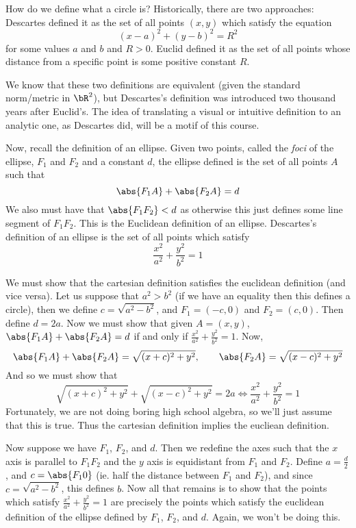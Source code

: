 \documentclass[10pt]{article}
\begin{document}


\bigskip

How do we define what a circle is?
Historically, there are two approaches: Descartes defined it as the set of all points $(x,y)$ which satisfy the equation
\[ (x-a)^2 + (y-b)^2 = R^2 \]
for some values $a$ and $b$ and $R>0$.
Euclid defined it as the set of all points whose distance from a specific point is some positive constant $R$.

We know that these two definitions are equivalent (given the standard norm/metric in $\bR^2$), but Descartes's definition was introduced two thousand years after Euclid's.
The idea of translating a visual or intuitive definition to an analytic one, as Descartes did, will be a motif of this course.

Now, recall the definition of an ellipse.
Given two points, called the \emph{foci} of the ellipse, $F_1$ and $F_2$ and a constant $d$, the ellipse defined is the set of all points $A$ such that
\[ \abs{F_1A} + \abs{F_2A} = d \]
We also must have that $\abs{F_1F_2}<d$ as otherwise this just defines some line segment of $F_1F_2$.
This is the Euclidean definition of an ellipse.
Descartes's definition of an ellipse is the set of all points which satisfy
\[ \frac{x^2}{a^2} + \frac{y^2}{b^2} = 1 \]

We must show that the cartesian definition satisfies the euclidean definition (and vice versa).
Let us suppose that $a^2>b^2$ (if we have an equality then this defines a circle), then we define $c=\sqrt{a^2-b^2}$, and $F_1=(-c,0)$ and $F_2=(c,0)$.
Then define $d=2a$.
Now we must show that given $A=(x,y)$, $\abs{F_1A}+\abs{F_2A}=d$ if and only if $\frac{x^2}{a^2} + \frac{y^2}{b^2} = 1$.
Now,
\[ \abs{F_1A} + \abs{F_2A} = \sqrt{(x+c)^2 + y^2},\qquad \abs{F_2A} = \sqrt{(x-c)^2 + y^2} \]
And so we must show that
\[ \sqrt{(x+c)^2 + y^2} + \sqrt{(x-c)^2 + y^2} = 2a \iff \frac{x^2}{a^2} + \frac{y^2}{b^2} = 1 \]
Fortunately, we are not doing boring high school algebra, so we'll just assume that this is true.
Thus the cartesian definition implies the eucliean definition.

Now suppose we have $F_1$, $F_2$, and $d$.
Then we redefine the axes such that the $x$ axis is parallel to $F_1F_2$ and the $y$ axis is equidistant from $F_1$ and $F_2$.
Define $a=\frac d2$, and $c=\abs{F_10}$ (ie. half the distance between $F_1$ and $F_2$), and since $c=\sqrt{a^2-b^2}$, this defines $b$.
Now all that remains is to show that the points which satisfy $\frac{x^2}{a^2}+\frac{y^2}{b^2}=1$ are precisely the points which satisfy the euclidean definition of the ellipse defined by $F_1$, $F_2$, and
$d$.
Again, we won't be doing this.
\end{document}
